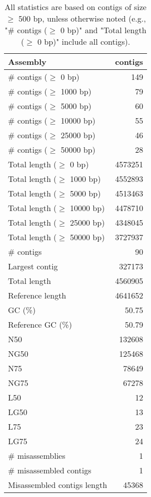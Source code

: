 \documentclass[12pt,a4paper]{article}
\begin{document}
\begin{table}[ht]
\begin{center}
\caption{All statistics are based on contigs of size $\geq$ 500 bp, unless otherwise noted (e.g., "\# contigs ($\geq$ 0 bp)" and "Total length ($\geq$ 0 bp)" include all contigs).}
\begin{tabular}{|l*{1}{|r}|}
\hline
Assembly & contigs \\ \hline
\# contigs ($\geq$ 0 bp) & 149 \\ \hline
\# contigs ($\geq$ 1000 bp) & 79 \\ \hline
\# contigs ($\geq$ 5000 bp) & 60 \\ \hline
\# contigs ($\geq$ 10000 bp) & 55 \\ \hline
\# contigs ($\geq$ 25000 bp) & 46 \\ \hline
\# contigs ($\geq$ 50000 bp) & 28 \\ \hline
Total length ($\geq$ 0 bp) & 4573251 \\ \hline
Total length ($\geq$ 1000 bp) & 4552893 \\ \hline
Total length ($\geq$ 5000 bp) & 4513463 \\ \hline
Total length ($\geq$ 10000 bp) & 4478710 \\ \hline
Total length ($\geq$ 25000 bp) & 4348045 \\ \hline
Total length ($\geq$ 50000 bp) & 3727937 \\ \hline
\# contigs & 90 \\ \hline
Largest contig & 327173 \\ \hline
Total length & 4560905 \\ \hline
Reference length & 4641652 \\ \hline
GC (\%) & 50.75 \\ \hline
Reference GC (\%) & 50.79 \\ \hline
N50 & 132608 \\ \hline
NG50 & 125468 \\ \hline
N75 & 78649 \\ \hline
NG75 & 67278 \\ \hline
L50 & 12 \\ \hline
LG50 & 13 \\ \hline
L75 & 23 \\ \hline
LG75 & 24 \\ \hline
\# misassemblies & 1 \\ \hline
\# misassembled contigs & 1 \\ \hline
Misassembled contigs length & 45368 \\ \hline

\end{tabular}
\end{center}
\end{table}
\end{document}
